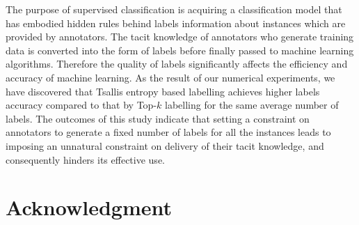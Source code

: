 \documentclass[a4paper,conference]{IEEEtran}
\begin{document}
The purpose of supervised classification is acquiring a classification model that has embodied hidden rules behind labels information about instances which are provided by annotators.
The tacit knowledge of annotators who generate training data is converted into the form of labels before finally passed to machine learning algorithms.
Therefore the quality of labels significantly affects the efficiency and accuracy of machine learning.
As the result of our numerical experiments, we have discovered that Tsallis entropy based labelling achieves higher labels accuracy compared to that by Top-$k$ labelling for the same average number of labels.
The outcomes of this study indicate that setting a constraint on annotators to generate a fixed number of labels for all the instances leads to imposing an unnatural constraint on delivery of their tacit knowledge, and consequently hinders its effective use.

\section*{Acknowledgment}



\end{document}
